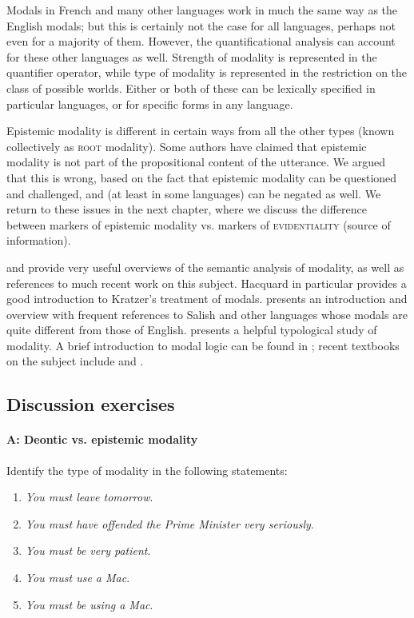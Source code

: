 Modals in French and many other languages work in much the same way as the English modals; but this is certainly not the case for all languages, perhaps not even for a majority of them. However, the quantificational analysis can account for these other languages as well. Strength of modality is represented in the quantifier operator, while type of modality is represented in the restriction on the class of possible worlds. Either or both of these can be lexically specified in particular languages, or for specific forms in any language.



Epistemic modality is different in certain ways from all the other types (known collectively as \textsc{root} modality). Some authors have claimed that epistemic modality is not part of the propositional content of the utterance. We argued that this is wrong, based on the fact that epistemic modality can be questioned and challenged, and (at least in some languages) can be negated as well. We return to these issues in the next chapter, where we discuss the difference between markers of epistemic modality vs. markers of \textsc{evidentiality} (source of information).



\furtherreading



 and \citet{Hacquard2011} provide very useful overviews of the semantic analysis of modality, as well as references to much recent work on this subject. Hacquard in particular provides a good introduction to Kratzer’s treatment of modals. \citet{Matthewson2016} presents an introduction and overview with frequent references to Salish and other languages whose modals are quite different from those of English.  presents a helpful typological study of modality. A brief introduction to modal logic can be found in \citet{Garson2016}; recent textbooks on the subject include \citet{BlackburnEtAl2008} and  \citet{vanBenthem2010}.


\subsection*{Discussion exercises}
\paragraph*{A: Deontic vs. epistemic modality}
Identify the type of modality in the following statements:\\\begin{enumerate}[label=\alph*.]
\item  \textit{You must leave tomorrow}.
\item \textit{You must have offended the Prime Minister very seriously}.
\item \textit{You must be very patient}.
\item \textit{You must use a Mac}.
\item \textit{You must be using a Mac}.
\end{enumerate}

